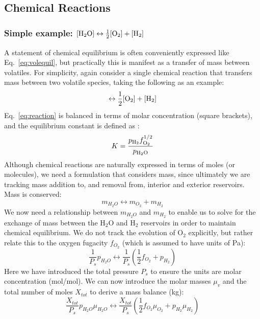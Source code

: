 \subsection{Chemical Reactions}
\label{sect:chemreact}
\subsubsection{Simple example: $[\rm{H}_2O]\leftrightarrow \frac{1}{2} [\rm{O}_2] + [\rm{H}_2]$}
A statement of chemical equilibrium is often conveniently expressed like Eq.~\ref{eq:volequil}, but practically this is manifest as a transfer of mass between volatiles.  For simplicity, again consider a single chemical reaction that transfers mass between two volatile species, taking the following as an example:
\begin{equation}
    [\rm{H}_2O]\leftrightarrow \frac{1}{2} [\rm{O}_2] + [\rm{H}_2]
    \label{eq:reaction}
\end{equation}
Eq.~\ref{eq:reaction} is balanced in terms of molar concentration (square brackets), and the equilibrium constant is defined as \cite[e.g.][]{SF17}:
\begin{equation}
K=\frac{p_{\rm H_2} f_{\rm O_2}^{1/2}}{p_{\rm H_2\rm O}}
\end{equation}
Although chemical reactions are naturally expressed in terms of moles (or molecules), we need a formulation that considers mass, since ultimately we are tracking mass addition to, and removal from, interior and exterior reservoirs.  Mass is conserved:
\begin{equation}
m_{H_2O} \leftrightarrow m_{O_2} + m_{H_2}
\label{eq:reaction_mass}
\end{equation}
We now need a relationship between $m_{H_2O}$ and $m_{H_2}$ to enable us to solve for the exchange of mass between the H$_2$O and H$_2$ reservoirs in order to maintain chemical equilibrium.  We do not track the evolution of O$_2$ explicitly, but rather relate this to the oxygen fugacity $f_{O_2}$ (which is assumed to have units of Pa):
\begin{equation}
    \frac{1}{P_s} p_{H_2O} \leftrightarrow \frac{1}{P_s} \left( \frac{1}{2} f_{O_2} + p_{H_2} \right)
    \label{eq:reactionp}
\end{equation}
Here we have introduced the total pressure $P_s$ to ensure the units are molar concentration (mol/mol).  We can now introduce the molar masses $\mu_v$ and the total number of moles $X_{tot}$ to derive a mass balance (kg):
\begin{equation}
    \frac{X_{tot}}{P_s} p_{H_2O} \mu_{H_2O} \leftrightarrow \frac{X_{tot}}{P_s} \left( \frac{1}{2} f_{O_2} \mu_{O_2} + p_{H_2} \mu_{H_2} \right)
    \label{eq:reaction_mass2}
\end{equation}
